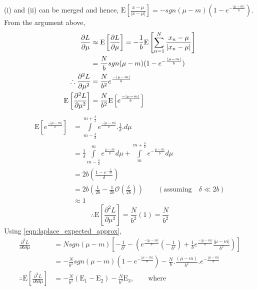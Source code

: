 \documentclass[wcp]{jmlr}
\begin{document}
(i) and (ii) can be merged and hence, $\mathrm{E}\left[\frac{x-\mu}{|x-\mu|}\right] = - sgn(\mu-m) (1 - e^{-\frac{|\mu-m|}{b}})$. From the argument above,
\begin{align}
 \frac{\partial L}{\partial \mu} &\approx \mathrm{E}\left[\frac{\partial L}{\partial \mu}\right] = -\frac{1}{b} \mathrm{E}\left[\sum_{n=1}^{N}\frac{x_n-\mu}{|x_n-\mu|}\right]\notag\\
 &= \frac{N}{b} sgn(\mu-m) (1 - e^{-\frac{|\mu-m|}{b}}) \label{eqn:laplace_expected_approx}\\
 \therefore \frac{\partial^2 L}{\partial \mu^2} &= \frac{N}{b^2} e^{\frac{-|\mu-m|}{b}} \notag\\
 \mathrm{E} \left[\frac{\partial^2 L}{\partial \mu^2}\right] &= \frac{N}{b^2} \mathrm{E}\left[e^{\frac{-|\mu-m|}{b}}\right] \notag
\end{align}
\begin{align*}
 \mathrm{E}\left[e^{\frac{-|\mu-m|}{b}}\right] &= \int\limits_{m-\frac{\delta}{2}}^{m+\frac{\delta}{2}} e^{\frac{-|\mu-m|}{b}} . \frac{1}{\delta} . d\mu \\
 &= \frac{1}{\delta} \int\limits_{m-\frac{\delta}{2}}^{m} e^{\frac{\mu-m}{b}} d\mu + \int\limits_{m}^{m+\frac{\delta}{2}}e^{-\frac{\mu-m}{b}} d\mu \\
 &= 2b \left(\frac{1-e^{-\frac{\delta}{2b}}}{\delta}\right) \\
 &= 2b \left( \frac{1}{2b} - \frac{1}{2b}\mathcal{O}\left(\frac{\delta}{2b}\right) \right) \quad\quad(\mathrm{assuming} \quad \delta \ll 2b) \\
 &\approx 1
 \end{align*}
\begin{equation*}
 \therefore \mathrm{E} \left[\frac{\partial^2 L}{\partial \mu^2}\right] = \frac{N}{b^2} (1) = \frac{N}{b^2}
\end{equation*}
Using \eqref{eqn:laplace_expected_approx}, 
\begin{align*}
 \frac{\partial^2 L}{\partial b \partial \mu} &= N sgn(\mu-m) \left[ -\frac{1}{b^2} - \left( e^{\frac{-|\mu-m|}{b}} \left( -\frac{1}{b^2} \right) + \frac{1}{b} e^{\frac{-|\mu-m|}{b}} \frac{|\mu-m|}{b^2} \right) \right] \\
 &= -\frac{N}{b^2} sgn(\mu-m)(1-e^{-\frac{|\mu-m|}{b}}) - \frac{N}{b} . \frac{(\mu-m)}{b^2} . e^{-\frac{|\mu-m|}{b}} \\
 \therefore \mathrm{E} \left[\frac{\partial^2 L}{\partial b \partial \mu}\right] &= -\frac{N}{b^2} (\mathrm{E}_1 - \mathrm{E}_2) - \frac{N}{b^3} \mathrm{E}_3, \quad\quad\mathrm{where}
\end{align*}
\end{document}
